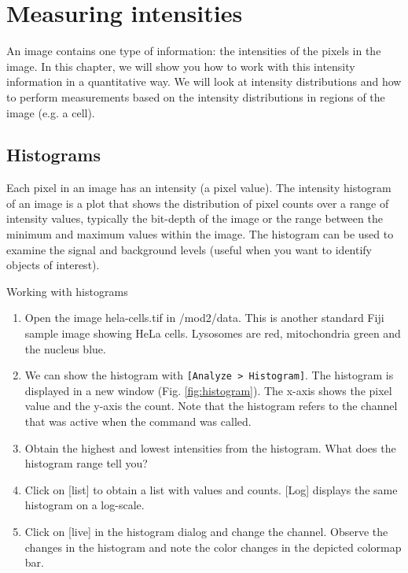 \chapter{Measuring intensities}
An image contains one type of information: the intensities of the pixels in the image. In this chapter, we will show you how to work with this intensity information in a quantitative way. We will look at intensity distributions and how to perform measurements based on the intensity distributions in regions of the image (e.g. a cell). 

\section{Histograms}
Each pixel in an image has an intensity (a pixel value). The intensity histogram of an image is a plot that shows the distribution of pixel counts over a range of intensity values, typically the bit-depth of the image or the range between the minimum and maximum values within the image. The histogram can be used to examine the signal and background levels (useful when you want to identify objects of interest).

\begin{taskbox}{Working with histograms}
\begin{enumerate}
	\item Open the image hela-cells.tif in /mod2/data. This is another standard Fiji sample image showing HeLa cells. Lysosomes are red, mitochondria green and the nucleus blue. 
	\item We can show the histogram with \texttt{[Analyze > Histogram]}. The histogram is displayed in a new window (Fig. \ref{fig:histogram}). The x-axis shows the pixel value and the y-axis the count. Note that the histogram refers to the channel that was active when the command was called.
	
	\begin{minipage}[t]{\linewidth}
		\begin{center}
		\medskip
		\label{fig:histogram}
		\end{center}
	\end{minipage}
	
	\item Obtain the highest and lowest intensities from the histogram. What does the histogram range tell you?
	\item Click on [list] to obtain a list with values and counts. [Log] displays the same histogram on a log-scale.
	\item Click on [live] in the histogram dialog and change the channel. Observe the changes in the histogram and note the color changes in the depicted colormap bar.
	
\end{enumerate}

\end{taskbox}

